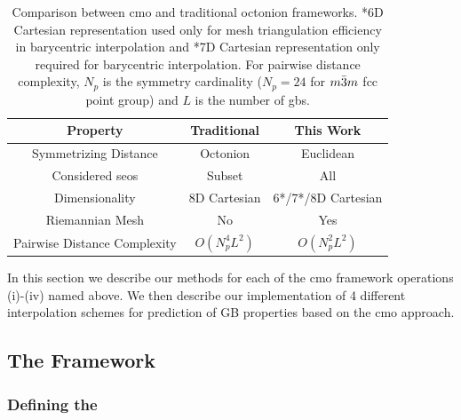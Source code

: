 \documentclass[preprint,12pt]{elsarticle}
\begin{document}
\begin{table}
\caption{Comparison between \acrlong{cmo} and traditional octonion frameworks. *6D Cartesian representation used only for mesh triangulation efficiency in barycentric interpolation and *7D Cartesian representation only required for barycentric interpolation. For pairwise distance complexity, $N_p$ is the symmetry cardinality ($N_p=24$ for $m\Bar{3}m$ \gls{fcc} point group) and $L$ is the number of \glspl{gb}.}
\centering
\begin{tabular}{ccc}
\toprule
Property & Traditional & This Work \\
\midrule
Symmetrizing Distance & Octonion & Euclidean \\
Considered \glspl{seo} & Subset & All \\
Dimensionality & 8D Cartesian & 6*/7*/8D Cartesian \\
Riemannian Mesh & No & Yes \\
Pairwise Distance Complexity & $O(N_p^4L^2)$ & $O(N_p^2L^2)$ \\
\bottomrule
\end{tabular}
\label{tab:closed-mesh-comparison}
\end{table}

In this section we describe our methods for each of the \gls{cmo} framework operations (i)-(iv) named above. We then describe our implementation of 4 different interpolation schemes for prediction of GB properties based on the \gls{cmo} approach.

\subsection{The  Framework}
\label{sec:methods:framework}

\subsubsection{Defining the }
\label{sec:methods:pFZ}

\end{document}
